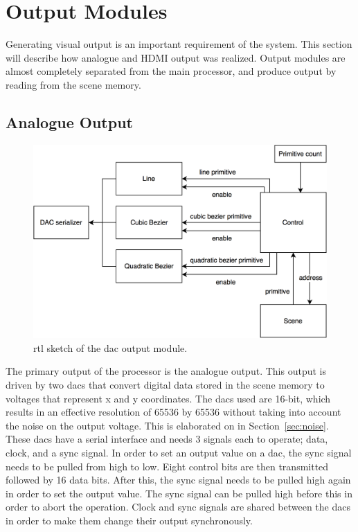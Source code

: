 \chapter{Output Modules}
\label{chap:Output}

Generating visual output is an important requirement of the system.
This section will describe how analogue and HDMI output was realized.
Output modules are almost completely separated from the main processor, and produce output by reading from the scene memory.

\section{Analogue Output}

\begin{figure}[h!]
    \includegraphics[width=\linewidth]{images/dac-output.png}
    \caption{\gls{rtl} sketch of the \vthreek \gls{dac} output module.}
    \label{fig:dac-output}
\end{figure}

The primary output of the processor is the analogue output.
This output is driven by two \gls{dac}s that convert digital data stored in the scene memory to voltages that represent x and y coordinates.
The \gls{dac}s used are 16-bit, which results in an effective resolution of 65536 by 65536 without taking into account the noise on the output voltage.
This is elaborated on in Section~\ref{sec:noise}.
These \gls{dac}s have a serial interface and needs 3 signals each to operate; data, clock, and a sync signal.
In order to set an output value on a \gls{dac}, the sync signal needs to be pulled from high to low.
Eight control bits are then transmitted followed by 16 data bits.
After this, the sync signal needs to be pulled high again in order to set the output value.
The sync signal can be pulled high before this in order to abort the operation.
Clock and sync signals are shared between the \gls{dac}s in order to make them change their output synchronously.

